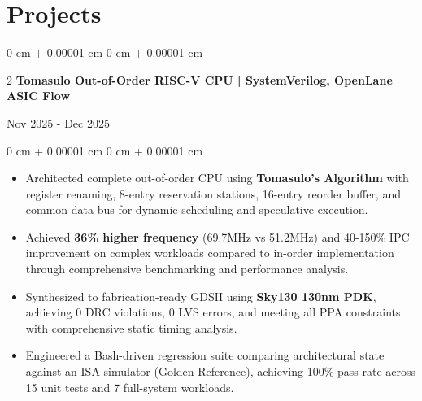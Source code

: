 \documentclass[10pt, letterpaper]{article}
\newenvironment{highlights}{
    \begin{itemize}[
        topsep=0.05 cm,
        parsep=0.05 cm,
        partopsep=0pt,
        itemsep=0pt,
        leftmargin=0 cm + 10pt
    ]
}{
    \end{itemize}
}
\newenvironment{onecolentry}{
    \begin{adjustwidth}{
        0 cm + 0.00001 cm
    }{
        0 cm + 0.00001 cm
    }
}{
    \end{adjustwidth}
}
\newenvironment{twocolentry}[2][]{
    \onecolentry
    \def\secondColumn{#2}
    \setcolumnwidth{\fill, 4.5 cm}
    \begin{paracol}{2}
}{
    \switchcolumn \raggedleft \secondColumn
    \end{paracol}
    \endonecolentry
}
\begin{document}
    \section{Projects}

        \begin{twocolentry}{
            Nov 2025 - Dec 2025 } \textbf{Tomasulo Out-of-Order RISC-V CPU | SystemVerilog, OpenLane ASIC Flow}
        \end{twocolentry}
        \vspace{0.05 cm}
        \begin{onecolentry}
            \begin{highlights}
                \item Architected complete out-of-order CPU using \textbf{Tomasulo's Algorithm} with register renaming, 8-entry reservation stations, 16-entry reorder buffer, and common data bus for dynamic scheduling and speculative execution.
                \item Achieved \textbf{36\% higher frequency} (69.7MHz vs 51.2MHz) and 40-150\% IPC improvement on complex workloads compared to in-order implementation through comprehensive benchmarking and performance analysis.
                \item Synthesized to fabrication-ready GDSII using \textbf{Sky130 130nm PDK}, achieving 0 DRC violations, 0 LVS errors, and meeting all PPA constraints with comprehensive static timing analysis.
                \item Engineered a Bash-driven regression suite comparing architectural state against an ISA simulator (Golden Reference), achieving 100\% pass rate across 15 unit tests and 7 full-system workloads.
            \end{highlights}
        \end{onecolentry}
\end{document}
